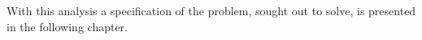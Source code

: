 With this analysis a specification of the problem, sought out to solve, is presented in the following chapter.
%
%
%
%
%
%
%
%
